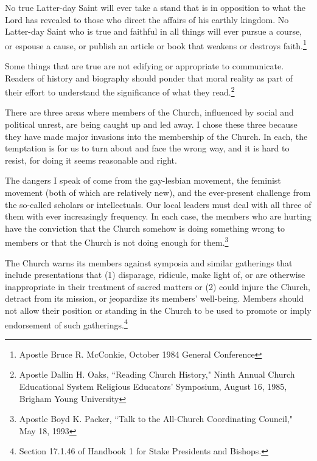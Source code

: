 \begin{displayquote}
No true Latter-day Saint will ever take a stand that is in opposition to what the 
Lord has revealed to those who direct the affairs of his earthly kingdom. No 
Latter-day Saint who is true and faithful in all things will ever pursue a course, 
or espouse a cause, or publish an article or book that weakens or destroys 
faith.\footnote{Apostle Bruce R. McConkie, October 1984 General Conference}
\end{displayquote}

\begin{displayquote}
Some things that are true are not edifying or appropriate to communicate. Readers 
of history and biography should ponder that moral reality as part of their effort to 
understand the significance of what they read.\footnote{Apostle Dallin H. Oaks, 
``Reading Church History," Ninth Annual Church Educational System Religious 
Educators' Symposium, August 16, 1985, Brigham Young University}
\end{displayquote}

\begin{displayquote}
There are three areas where members of the Church, influenced by social and political
unrest, are being caught up and led away. I chose these three because they have made
major invasions into the membership of the Church. In each, the temptation is for us
to turn about and face the wrong way, and it is hard to resist, for doing it seems
reasonable and right.

The dangers I speak of come from the gay-lesbian movement, the feminist movement
(both of which are relatively new), and the ever-present challenge from the so-called
scholars or intellectuals. Our local leaders must deal with all three of them with
ever increasingly frequency. In each case, the members who are hurting have the
conviction that the Church somehow is doing something wrong to members or that the
Church is not doing enough for them.\footnote{Apostle Boyd K. Packer, 
``Talk to the All-Church Coordinating Council," May 18, 1993}
\end{displayquote}

\begin{displayquote}
The Church warns its members against symposia and similar gatherings that include
presentations that (1) disparage, ridicule, make light of, or are otherwise
inappropriate in their treatment of sacred matters or (2) could injure the Church,
detract from its mission, or jeopardize its members’ well-being. Members should not
allow their position or standing in the Church to be used to promote or imply
endorsement of such gatherings.\footnote{Section 17.1.46 of Handbook 1 for Stake 
Presidents and Bishops.}
\end{displayquote}

